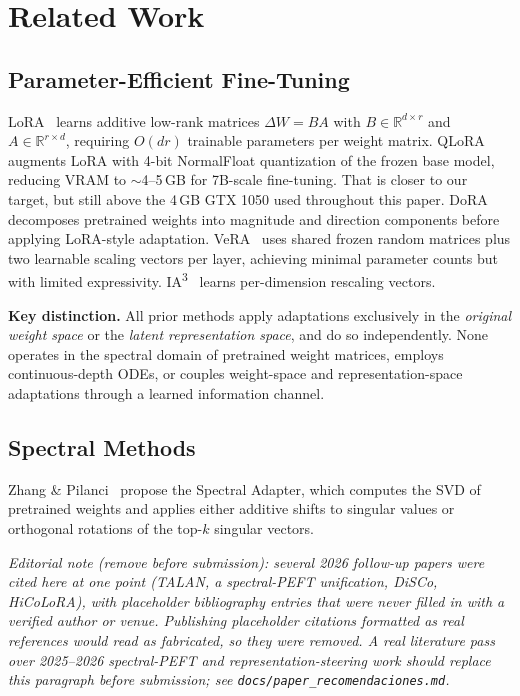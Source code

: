 \documentclass[conference]{IEEEtran}
\newcommand{\RR}{\mathbb{R}}
\begin{document}
\section{Related Work}

\subsection{Parameter-Efficient Fine-Tuning}

LoRA~\cite{hu2021lora} learns additive low-rank matrices $\Delta W = BA$ with $B \in \RR^{d \times r}$ and $A \in \RR^{r \times d}$, requiring $O(dr)$ trainable parameters per weight matrix. QLoRA~\cite{dettmers2023qlora} augments LoRA with 4-bit NormalFloat quantization of the frozen base model, reducing VRAM to $\sim$4--5\,GB for 7B-scale fine-tuning. That is closer to our target, but still above the 4\,GB GTX 1050 used throughout this paper. DoRA~\cite{liu2024dora} decomposes pretrained weights into magnitude and direction components before applying LoRA-style adaptation. VeRA~\cite{kopiczko2024vera} uses shared frozen random matrices plus two learnable scaling vectors per layer, achieving minimal parameter counts but with limited expressivity. IA\textsuperscript{3}~\cite{liu2022ia3} learns per-dimension rescaling vectors.

\textbf{Key distinction.} All prior methods apply adaptations exclusively in the \textit{original weight space} or the \textit{latent representation space}, and do so independently. None operates in the spectral domain of pretrained weight matrices, employs continuous-depth ODEs, or couples weight-space and representation-space adaptations through a learned information channel.

\subsection{Spectral Methods}

Zhang \& Pilanci~\cite{zhang2024spectral} propose the Spectral Adapter, which computes the SVD of pretrained weights and applies either additive shifts to singular values or orthogonal rotations of the top-$k$ singular vectors.

\textit{Editorial note (remove before submission): several 2026 follow-up papers were cited here at one point (TALAN, a spectral-PEFT unification, DiSCo, HiCoLoRA), with placeholder bibliography entries that were never filled in with a verified author or venue. Publishing placeholder citations formatted as real references would read as fabricated, so they were removed. A real literature pass over 2025--2026 spectral-PEFT and representation-steering work should replace this paragraph before submission; see \texttt{docs/paper\_recomendaciones.md}.}
\end{document}
